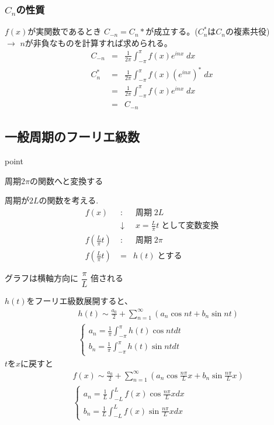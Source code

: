 \documentclass[a4paper]{jsarticle}
\begin{document}
\subsubsection*{$C_n$の性質}
$f\left(x\right)$が実関数であるとき $C_{-n}=C_n*$が成立する。($C_n^*$は$C_n$の複素共役)\\
$\rightarrow$ $n$が非負なものを計算すれば求められる。
\begin{eqnarray*}
    C_{-n} &=& \frac{1}{2\pi} \int^{\pi}_{-\pi} f\left(x\right) e^{inx} \;dx\\
    C_{n}^* &=& \frac{1}{2\pi} \int^{\pi}_{-\pi} f\left(x\right) \left(e^{inx}\right)^* \;dx\\
    &=& \frac{1}{2\pi} \int^{\pi}_{-\pi} f\left(x\right) e^{inx} \;dx\\
    &=& C_{-n}
\end{eqnarray*}

\subsection{一般周期のフーリエ級数}
\begin{itembox}[l]{point}
    \begin{center}
        周期$2\pi$の関数へと変換する
    \end{center}
\end{itembox}
周期が$2L$の関数を考える.
\begin{eqnarray*}
    f\left(x\right) \;&:&\; 周期 \; 2L\\
    &\downarrow& \; x = \frac{L}{\pi} t \; として変数変換\\
    f\left(\frac{L}{\pi} t\right) \;&:&\; 周期 \; 2\pi\\
    f\left(\frac{L}{\pi} t\right) &=& h\left(t\right) \; とする
\end{eqnarray*}
\begin{center}
    グラフは横軸方向に $\dfrac{\pi}{L}$ 倍される
\end{center}

$h\left(t\right)$をフーリエ級数展開すると、
\begin{eqnarray*}
    &&h\left(t\right) \sim \frac{a_0}{2}+\sum^{\infty}_{n=1}\left(a_n \cos nt + b_n \sin nt\right)\\
    &&\begin{cases}
        a_n=\displaystyle\frac{1}{\pi}\int^{\pi}_{-\pi}h\left(t\right)\cos nt dt \\
        b_n=\displaystyle\frac{1}{\pi}\int^{\pi}_{-\pi}h\left(t\right)\sin nt dt
    \end{cases}
\end{eqnarray*}
$t$を$x$に戻すと
\begin{eqnarray*}
    &&f\left(x\right) \sim \frac{a_0}{2}+\sum^{\infty}_{n=1}\left(a_n \cos \frac{n\pi}{L}x + b_n \sin \frac{n\pi}{L}x\right)\\
    &&\begin{cases}
        a_n=\displaystyle\frac{1}{L}\int^{L}_{-L}f\left(x\right)\cos \frac{n\pi}{L}x dx \\
        b_n=\displaystyle\frac{1}{L}\int^{L}_{-L}f\left(x\right)\sin \frac{n\pi}{L}x dx
    \end{cases}
\end{eqnarray*}
\end{document}
